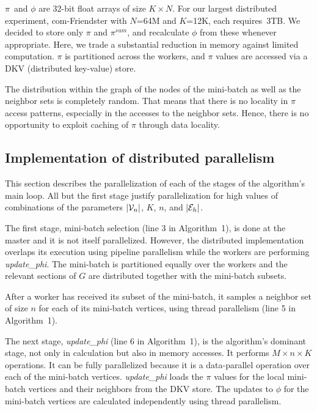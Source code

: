 $\pi$~and $\phi$ are 32-bit float arrays of size $K \times N$. For our
largest distributed experiment, com-Friendster with $N$=64M and $K$=12K, each
requires~3TB. We decided to store only $\pi$ and $\pi^{sum}$, and recalculate
$\phi$ from these whenever appropriate. Here, we trade a substantial reduction
in memory against limited computation. $\pi$ is partitioned across the workers,
and $\pi$ values are accessed via a DKV (distributed key-value) store.


The distribution within the graph of the nodes of the mini-batch as well as
the neighbor sets is completely random. That means that there is no locality
in $\pi$ access patterns, especially in the accesses to the neighbor sets.
Hence, there is no opportunity to exploit caching of $\pi$ through data
locality.


\subsection{Implementation of distributed parallelism}

This section describes the parallelization of each of the stages of the
algorithm's main loop. All but the first stage justify parallelization for
high values of combinations of the  parameters $|\cV_n|$, $K$, $n$, and $|\cE_h|$.

The first stage, mini-batch selection (line 3 in Algorithm~1), is done at the master and it is
not itself parallelized. However, the distributed implementation overlaps
its execution using pipeline parallelism while the workers are
performing \textit{update\_phi}. The mini-batch is partitioned equally over
the workers and the relevant sections of $G$ are distributed together with the
mini-batch subsets.

After a worker has received its subset of the mini-batch, it samples a neighbor
set of size $n$ for each of its mini-batch vertices, using thread parallelism
(line 5 in Algorithm~1).

The next stage, \textit{update\_phi} (line 6 in Algorithm~1), is the algorithm's dominant stage, not
only in calculation but also in memory accesses. It performs $M\times n\times
K$ operations. It can be fully parallelized because it is a data-parallel
operation over each of the mini-batch vertices. \textit{update\_phi} loads the
$\pi$ values for the local mini-batch vertices and their neighbors from the
DKV store. The updates to $\phi$ for the mini-batch vertices are calculated
independently using thread parallelism.


